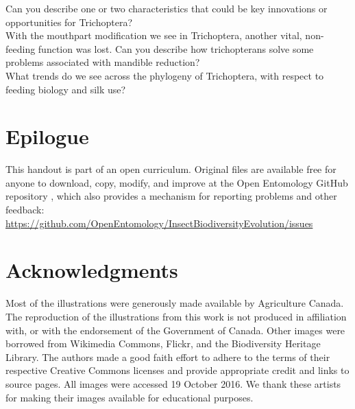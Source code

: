 \documentclass[letterpaper, 11pt]{article}
\begin{document}
\noindent{}Can you describe one or two characteristics that could be key innovations or opportunities for Trichoptera?\\

\noindent{}With the mouthpart modification we see in Trichoptera, another vital, non-feeding function was lost. Can you describe how trichopterans solve some problems associated with mandible reduction?\\

\noindent{}What trends do we see across the phylogeny of Trichoptera, with respect to feeding biology and silk use? \\

\FloatBarrier
\section*{Epilogue}
This handout is part of an open curriculum. Original files are available free for anyone to download, copy, modify, and improve at the Open Entomology GitHub repository \citep{ENT432}, which also provides a mechanism for reporting problems and other feedback:\\
\url{https://github.com/OpenEntomology/InsectBiodiversityEvolution/issues}

\section*{Acknowledgments}
Most of the illustrations were generously made available by Agriculture Canada. The reproduction of the illustrations from this work is not produced in affiliation with, or with the endorsement of the Government of Canada. Other images were borrowed from Wikimedia Commons, Flickr, and the Biodiversity Heritage Library. The authors made a good faith effort to adhere to the terms of their respective Creative Commons licenses and provide appropriate credit and links to source pages. All images were accessed 19 October 2016. We thank these artists for making their images available for educational purposes.

\FloatBarrier


\end{document}
